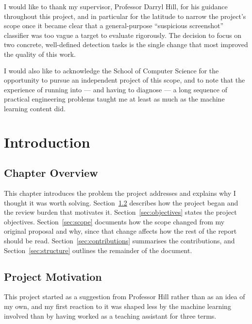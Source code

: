 \documentclass[12pt,oneside]{report}
\begin{document}
I would like to thank my supervisor, Professor Darryl Hill, for his guidance
throughout this project, and in particular for the latitude to narrow the
project's scope once it became clear that a general-purpose ``suspicious
screenshot'' classifier was too vague a target to evaluate rigorously. The
decision to focus on two concrete, well-defined detection tasks is the single
change that most improved the quality of this work.

I would also like to acknowledge the School of Computer Science for the
opportunity to pursue an independent project of this scope, and to note that
the experience of running into --- and having to diagnose --- a long sequence of
practical engineering problems taught me at least as much as the machine
learning content did.

\tableofcontents
\listoftables

\chapter{Introduction}

\section{Chapter Overview}

This chapter introduces the problem the project addresses and explains why I
thought it was worth solving. Section~\ref{sec:motivation} describes how the
project began and the review burden that motivates it.
Section~\ref{sec:objectives} states the project objectives.
Section~\ref{sec:scope} documents how the scope changed from my original
proposal and why, since that change affects how the rest of the report should
be read. Section~\ref{sec:contributions} summarises the contributions, and
Section~\ref{sec:structure} outlines the remainder of the document.

\section{Project Motivation}
\label{sec:motivation}

This project started as a suggestion from Professor Hill rather than as an idea
of my own, and my first reaction to it was shaped less by the machine learning
involved than by having worked as a teaching assistant for three terms.
\end{document}
